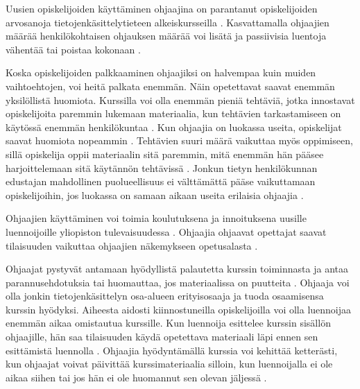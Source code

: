 \documentclass[finnish]{tktltiki2}
\theoremstyle{definition}
\theoremstyle{remark}
\begin{document}
Uusien opiskelijoiden käyttäminen ohjaajina on parantanut opiskelijoiden arvosanoja tietojenkäsittelytieteen alkeiskursseilla \cite{Decker06, Kurhila11}. Kasvattamalla ohjaajien määrää henkilökohtaisen ohjauksen määrää voi lisätä ja passiivisia luentoja vähentää tai poistaa kokonaan \cite{Kurhila11}. \par

Koska opiskelijoiden palkkaaminen ohjaajiksi on halvempaa kuin muiden vaihtoehtojen, voi heitä palkata enemmän. Näin opetettavat saavat enemmän yksilöllistä huomiota. Kurssilla voi olla enemmän pieniä tehtäviä, jotka innostavat opiskelijoita paremmin lukemaan materiaalia, kun tehtävien tarkastamiseen on käytössä enemmän henkilökuntaa \cite{Dickson11}. Kun ohjaajia on luokassa useita, opiskelijat saavat huomiota nopeammin \cite{Ferstl10}. Tehtävien suuri määrä vaikuttaa myös oppimiseen, sillä opiskelija oppii materiaalin sitä paremmin, mitä enemmän hän pääsee harjoittelemaan sitä käytännön tehtävissä \cite{Vikberg}. Jonkun tietyn henkilökunnan edustajan mahdollinen puolueellisuus ei välttämättä pääse vaikuttamaan opiskelijoihin, jos luokassa on samaan aikaan useita erilaisia ohjaajia \cite{Morgan02}.  \par

Ohjaajien käyttäminen voi toimia koulutuksena ja innoituksena uusille luennoijoille yliopiston tulevaisuudessa \cite{Roberts95, Morgan02}. Ohjaajia ohjaavat opettajat saavat tilaisuuden vaikuttaa ohjaajien näkemykseen opetusalasta \cite{Morgan02}. \par

Ohjaajat pystyvät antamaan hyödyllistä palautetta kurssin toiminnasta ja antaa parannusehdotuksia \cite{Decker06} tai huomauttaa, jos materiaalissa on puutteita \cite{Dickson11}. Ohjaaja voi olla jonkin tietojenkäsittelyn osa-alueen erityisosaaja ja tuoda osaamisensa kurssin hyödyksi. Aiheesta aidosti kiinnostuneilla opiskelijoilla voi olla luennoijaa enemmän aikaa omistautua kurssille. Kun luennoija esittelee kurssin sisällön ohjaajille, hän saa tilaisuuden käydä opetettava materiaali läpi ennen sen esittämistä luennolla \cite{Kopp00}. Ohjaajia hyödyntämällä kurssia voi kehittää ketterästi, kun ohjaajat voivat päivittää kurssimateriaalia silloin, kun luennoijalla ei ole aikaa siihen tai jos hän ei ole huomannut sen olevan jäljessä \cite{Dickson11}. \par
\end{document}
